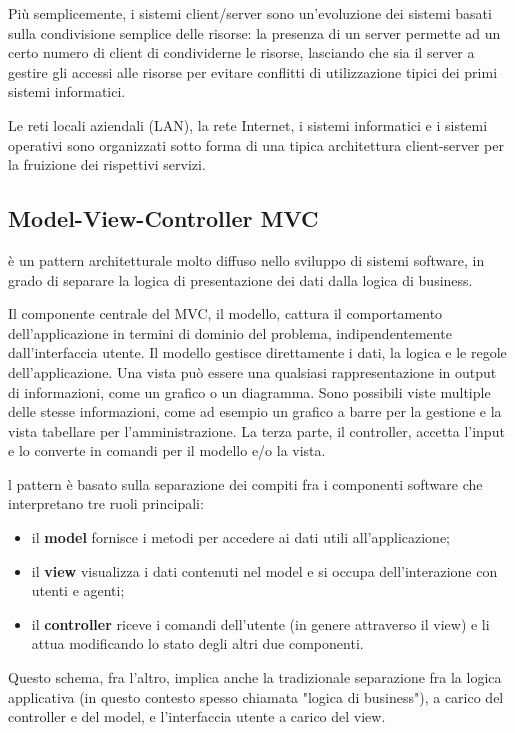 Più semplicemente, i sistemi client/server sono un'evoluzione dei sistemi basati sulla condivisione semplice delle risorse: la presenza di un server permette ad un certo numero di client di condividerne le risorse, lasciando che sia il server a gestire gli accessi alle risorse per evitare conflitti di utilizzazione tipici dei primi sistemi informatici.

Le reti locali aziendali (LAN), la rete Internet, i sistemi informatici e i sistemi operativi sono organizzati sotto forma di una tipica architettura client-server per la fruizione dei rispettivi servizi.

\subsection{Model-View-Controller MVC}
è un pattern architetturale molto diffuso nello sviluppo di sistemi software, in grado di separare la logica di presentazione dei dati dalla logica di business.

Il componente centrale del MVC, il modello, cattura il comportamento dell'applicazione in termini di dominio del problema, indipendentemente dall'interfaccia utente. Il modello gestisce direttamente i dati, la logica e le regole dell'applicazione.
Una vista può essere una qualsiasi rappresentazione in output di informazioni, come un grafico o un diagramma. Sono possibili viste multiple delle stesse informazioni, come ad esempio un grafico a barre per la gestione e la vista tabellare per l'amministrazione. La terza parte, il controller, accetta l'input e lo converte in comandi per il modello e/o la vista.

l pattern è basato sulla separazione dei compiti fra i componenti software che interpretano tre ruoli principali:
\begin{itemize}
\item il \textbf{model} fornisce i metodi per accedere ai dati utili all'applicazione;
\item il \textbf{view} visualizza i dati contenuti nel model e si occupa dell'interazione con utenti e agenti;
\item il \textbf{controller} riceve i comandi dell'utente (in genere attraverso il view) e li attua modificando lo stato degli altri due componenti.
\end{itemize}
Questo schema, fra l'altro, implica anche la tradizionale separazione fra la logica applicativa (in questo contesto spesso chiamata "logica di business"), a carico del controller e del model, e l'interfaccia utente a carico del view.

